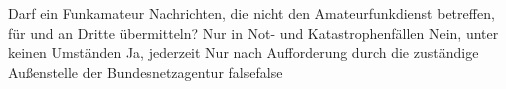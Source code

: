     {Darf ein Funkamateur Nachrichten, die nicht den Amateurfunkdienst betreffen, für und an Dritte übermitteln?}
    {Nur in Not- und Katastrophenfällen}
    {Nein, unter keinen Umständen}
    {Ja, jederzeit}
    {Nur nach Aufforderung durch die zuständige Außenstelle der Bundesnetzagentur}
    {false}{false}